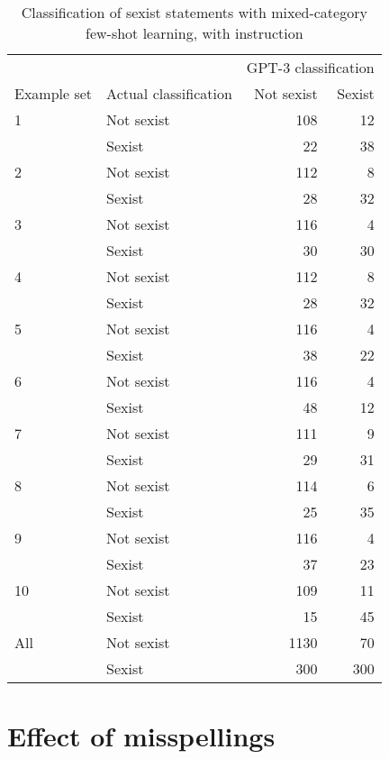 \documentclass{bmcart}
\begin{document}
\begin{backmatter}
\begin{table}[!h]
\caption{\label{tab:fewshotmixedinstruct-sexism}Classification of sexist statements with mixed-category few-shot learning, with instruction}
\centering
\fontsize{8}{10}\selectfont
\begin{tabular}[t]{llrr}
\hline
\multicolumn{2}{c}{ } & \multicolumn{2}{c}{GPT-3 classification} \\
Example set & Actual classification & Not sexist & Sexist\\
\hline
1 & Not sexist & 108 & 12\\
 & Sexist & 22 & 38\\
\hline
2 & Not sexist & 112 & 8\\
 & Sexist & 28 & 32\\
\hline
3 & Not sexist & 116 & 4\\
 & Sexist & 30 & 30\\
\hline
4 & Not sexist & 112 & 8\\
 & Sexist & 28 & 32\\
\hline
5 & Not sexist & 116 & 4\\
 & Sexist & 38 & 22\\
\hline
6 & Not sexist & 116 & 4\\
 & Sexist & 48 & 12\\
\hline
7 & Not sexist & 111 & 9\\
 & Sexist & 29 & 31\\
\hline
8 & Not sexist & 114 & 6\\
 & Sexist & 25 & 35\\
\hline
9 & Not sexist & 116 & 4\\
 & Sexist & 37 & 23\\
\hline
10 & Not sexist & 109 & 11\\
 & Sexist & 15 & 45\\
\hline
All & Not sexist & 1130 & 70\\
 & Sexist & 300 & 300\\
\hline
\end{tabular}
\end{table}

\newpage


\section{Effect of misspellings}\label{appendxc}

\begin{table}[!h]


\end{table}
\end{backmatter}
\end{document}
